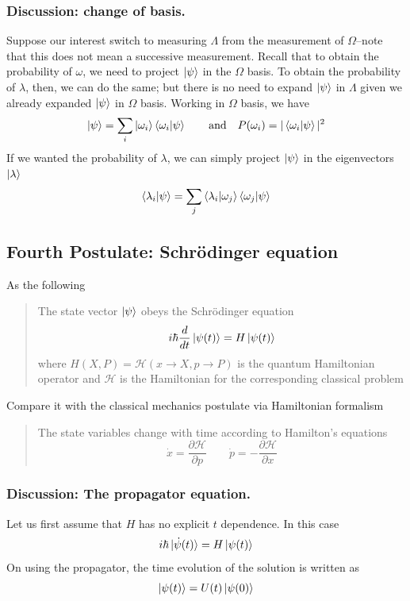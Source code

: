 \documentclass[../../../main.tex]{subfiles}
\begin{document}
\subsubsection{Discussion: change of basis.}
Suppose our interest switch to measuring $\Lambda$ from the measurement of $\Omega$--note that this does not mean a successive measurement.
Recall that to obtain the probability of $\omega$, we need to project $\ket{\psi}$ in the $\Omega$ basis.
To obtain the probability of $\lambda$, then, we can do the same; but there is no need to expand $\ket{\psi}$ in $\Lambda$ given we already expanded $\ket{\psi}$ in $\Omega$ basis.
Working in $\Omega$ basis, we have
\begin{equation*}
    \ket{\psi }=\sum_i \ket{\omega_i } \braket{\omega_i |\psi}\qquad\text{and}\quad P(\omega_i)=|\braket{\omega_i|\psi}|^2
\end{equation*}
If we wanted the probability of $\lambda$, we can simply project $\ket{\psi}$ in the eigenvectors $\ket{\lambda}$
\begin{equation*}
    \braket{\lambda_i|\psi}=\sum_j \braket{\lambda_i|\omega_j}\braket{\omega_j|\psi}
\end{equation*}


\subsection{Fourth Postulate: Schrödinger equation}
As the following
\begin{quotation}
    The state vector $\ket{\psi}$ obeys the Schrödinger equation
    \begin{equation*}
        i\hbar \frac{d }{dt }\ket{\psi(t )}= H \ket{\psi(t)}
    \end{equation*}
    where $H(X,P)=\mathcal{H }(x\rightarrow X, p\rightarrow P  )$ is the quantum Hamiltonian operator and $\mathcal{H }$ is the Hamiltonian for the corresponding classical problem
\end{quotation}
Compare it with the classical mechanics postulate via Hamiltonian formalism
\begin{quotation}
    The state variables change with time according to Hamilton's equations
    \begin{equation*}
        \dot{x}=\frac{\partial \mathcal{H }}{\partial p}\qquad \dot{p }=-\frac{\partial \mathcal{H }}{\partial x}
    \end{equation*}
\end{quotation}

\subsubsection{Discussion: The propagator equation.}
Let us first assume that $H$ has no explicit $t$ dependence. In this case
\begin{equation*}
    i \hbar \ket{\dot{\psi}(t)}=H \ket{\psi(t)}
\end{equation*}
On using the propagator, the time evolution of the solution is written as
\begin{equation*}
    \ket{\psi(t)}=U(t)\ket{\psi(0)}
\end{equation*}
\end{document}
